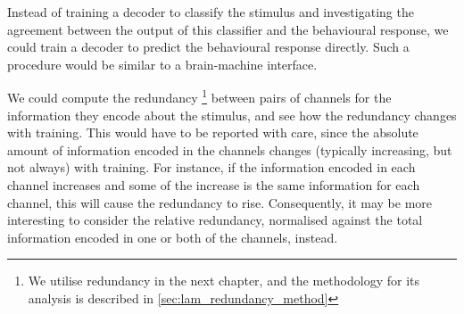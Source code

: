 Instead of training a decoder to classify the stimulus and investigating the agreement between the output of this classifier and the behavioural response, we could train a decoder to predict the behavioural response directly.
Such a procedure would be similar to a brain-machine interface.

We could compute the redundancy%
\footnote{We utilise redundancy in the next chapter, and the methodology for its analysis is described in \autoref{sec:lam_redundancy_method}}
between pairs of channels for the information they encode about the stimulus, and see how the redundancy changes with training.
This would have to be reported with care, since the absolute amount of information encoded in the channels changes (typically increasing, but not always) with training.
For instance, if the information encoded in each channel increases and some of the increase is the same information for each channel, this will cause the redundancy to rise.
Consequently, it may be more interesting to consider the relative redundancy, normalised against the total information encoded in one or both of the channels, instead.
